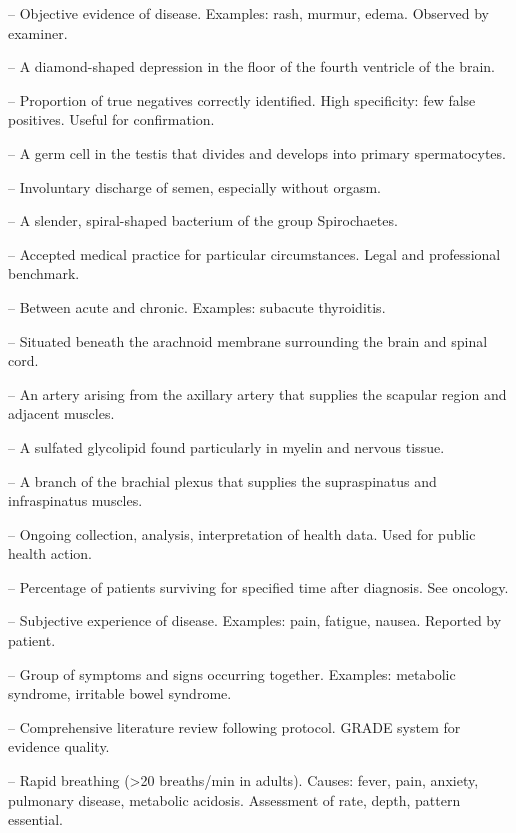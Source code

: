 -- Objective evidence of disease. Examples: rash, murmur, edema. Observed by examiner.

-- A diamond-shaped depression in the floor of the fourth ventricle of the brain.

-- Proportion of true negatives correctly identified. High specificity: few false positives. Useful for confirmation.

-- A germ cell in the testis that divides and develops into primary spermatocytes.

-- Involuntary discharge of semen, especially without orgasm.

-- A slender, spiral-shaped bacterium of the group Spirochaetes.

-- Accepted medical practice for particular circumstances. Legal and professional benchmark.

-- Between acute and chronic. Examples: subacute thyroiditis.

-- Situated beneath the arachnoid membrane surrounding the brain and spinal cord.

-- An artery arising from the axillary artery that supplies the scapular region and adjacent muscles.

-- A sulfated glycolipid found particularly in myelin and nervous tissue.

-- A branch of the brachial plexus that supplies the supraspinatus and infraspinatus muscles.

-- Ongoing collection, analysis, interpretation of health data. Used for public health action.

-- Percentage of patients surviving for specified time after diagnosis. See oncology.

-- Subjective experience of disease. Examples: pain, fatigue, nausea. Reported by patient.

-- Group of symptoms and signs occurring together. Examples: metabolic syndrome, irritable bowel syndrome.

-- Comprehensive literature review following protocol. GRADE system for evidence quality.

-- Rapid breathing (>20 breaths/min in adults). Causes: fever, pain, anxiety, pulmonary disease, metabolic acidosis. Assessment of rate, depth, pattern essential.

